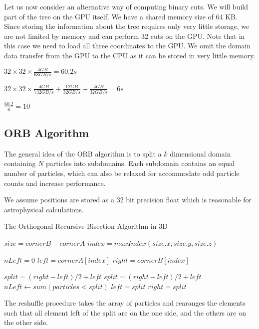\documentclass[]{article}
\begin{document}
Let us now consider an alternative way of computing binary cuts. We will build part of the tree on the GPU itself. We have a shared memory size of 64 KB. Since storing the information about the tree requires only very little storage, we are not limited by memory and can perform 32 cuts on the GPU. Note that in this case we need to load all three coordinates to the GPU. We omit the domain data transfer from the GPU to the CPU as it can be stored in very little memory. 

\begin{center}
	$32 \times 32 \times \frac{ 4 GB}{68 GB/s} = 60.2 s$ 
\end{center}

\begin{center}
	$32 \times 32 \times \frac{4 GB}{732 GB/s} + \frac{12 GB}{32 GB/s} + \frac{4 GB}{32 GB/s} = 6 s$ 
\end{center}

\begin{center}
	$\frac{60.2}{6} = 10$ 
\end{center}
 
\subsection{ORB Algorithm}
The general idea of the ORB algorithm is to split a $k$ dimensional domain containing $N$ particles into subdomains. Each subdomain contains an equal number of particles, which can also be relaxed for accommodate odd particle counts and increase performance. 

We assume positions are stored as a 32 bit precision float which is reasonable for astrophysical calculations. 
\begin{algorithm}[H]
	\caption{The Orthogonal Recursive Bisection Algorithm in 3D}\label{euclid}
	\begin{algorithmic}[1]
		\State $size = cornerB - cornerA$
		\State $index = maxIndex(size.x, size.y, size.z)$ 
	
		\State $nLeft = 0$
		\State $left = cornerA[index]$
		\State $right = cornerB[index]$
		
		\State $split = (right - left) / 2 + left $ 
		\State $split = (right - left) / 2 + left $
		\State $nLeft\gets sum(particles < split)$
			\State $left = split$
		\Else 
			\State $right = split$
		\EndIf
		\EndWhile\label{euclidendwhile}
		
		\State {}
		\EndProcedure
	\end{algorithmic}
\end{algorithm}

The reshuffle procedure takes the array of particles and rearanges the elements such that all element left of the split are on the one side, and the others are on the other side.



\end{document}
